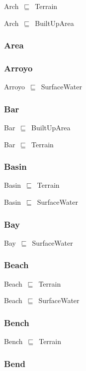 \documentclass{article}
\begin{document}
Arch~\ensuremath{\sqsubseteq}~Terrain~

Arch~\ensuremath{\sqsubseteq}~BuiltUpArea~

\subsubsection*{Area}

\subsubsection*{Arroyo}

Arroyo~\ensuremath{\sqsubseteq}~SurfaceWater~

\subsubsection*{Bar}

Bar~\ensuremath{\sqsubseteq}~BuiltUpArea~

Bar~\ensuremath{\sqsubseteq}~Terrain~

\subsubsection*{Basin}

Basin~\ensuremath{\sqsubseteq}~Terrain~

Basin~\ensuremath{\sqsubseteq}~SurfaceWater~

\subsubsection*{Bay}

Bay~\ensuremath{\sqsubseteq}~SurfaceWater~

\subsubsection*{Beach}

Beach~\ensuremath{\sqsubseteq}~Terrain~

Beach~\ensuremath{\sqsubseteq}~SurfaceWater~

\subsubsection*{Bench}

Bench~\ensuremath{\sqsubseteq}~Terrain~

\subsubsection*{Bend}
\end{document}
